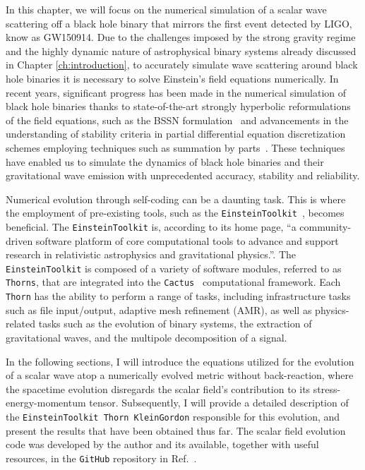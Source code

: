 In this chapter, we will focus on the numerical simulation of a scalar wave scattering off a black hole binary that mirrors the first event detected by LIGO, know as GW150914. Due to the challenges imposed by the strong gravity regime and the highly dynamic nature of astrophysical binary systems already discussed in Chapter \ref{ch:introduction}, to accurately simulate wave scattering around black hole binaries it is necessary to solve Einstein's field equations numerically. In recent years, significant progress has been made in the numerical simulation of black hole binaries thanks to state-of-the-art strongly hyperbolic reformulations of the field equations, such as the BSSN formulation~\cite{PhysRevD.52.5428,PhysRevD.59.024007} and advancements in the understanding of stability criteria in partial differential equation discretization schemes employing techniques such as summation by parts~\cite{Diener2007}. These techniques have enabled us to simulate the dynamics of black hole binaries and their gravitational wave emission with unprecedented accuracy, stability and reliability.

Numerical evolution through self-coding can be a daunting task. This is where the employment of pre-existing tools, such as the \texttt{EinsteinToolkit}~\cite{EinsteinToolkit:2022_11}, becomes beneficial. The \texttt{EinsteinToolkit} is, according to its home page, ``a community-driven software platform of core computational tools to advance and support research in relativistic astrophysics and gravitational physics.''. The \texttt{EinsteinToolkit} is composed of a variety of software modules, referred to as \texttt{Thorns}, that are integrated into the \texttt{Cactus}~\cite{Goodale:2002a} computational framework. Each \texttt{Thorn} has the ability to perform a range of tasks, including infrastructure tasks such as file input/output, adaptive mesh refinement (AMR), as well as physics-related tasks such as the evolution of binary systems, the extraction of gravitational waves, and the multipole decomposition of a signal.

In the following sections, I will introduce the equations utilized for the evolution of a scalar wave atop a numerically evolved metric without back-reaction, where the spacetime evolution disregards the scalar field's contribution to its stress-energy-momentum tensor. Subsequently, I will provide a detailed description of the \texttt{EinsteinToolkit Thorn KleinGordon} responsible for this evolution, and present the results that have been obtained thus far. The scalar field evolution code was developed by the author and its available, together with useful resources, in the \texttt{GitHub} repository in Ref.~\cite{FieldPerturbationsRepo}.


